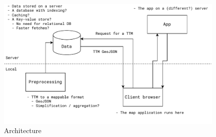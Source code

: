 \begin{figure}[H]
	\centering
	\includegraphics[width=1\textwidth]{images/architechture}
	\caption{Architecture}
	\label{fig:architechture}
\end{figure}




